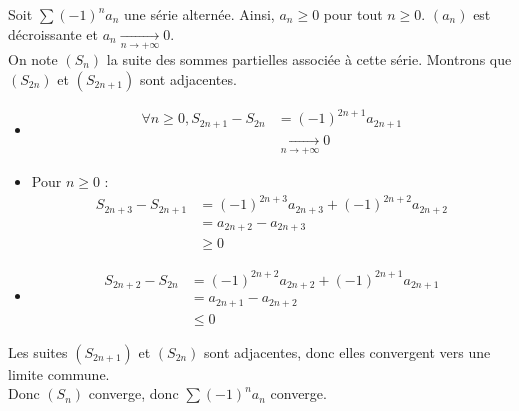 \documentclass[../main.tex]{subfiles}
\begin{document}
\noindent Soit $\sum (-1)^n a_n$ une série alternée. Ainsi, $a_n \geq 0$ pour tout $n\geq 0$. $(a_n)$ est décroissante et $a_n \underset{n \to +\infty}{\longrightarrow} 0$. \\
On note $(S_n)$ la suite des sommes partielles associée à cette série. Montrons que $(S_{2n})$ et $(S_{2n + 1})$ sont adjacentes. 
\begin{itemize}
    \item \begin{align*}
        \forall n\geq 0, S_{2n+1} - S_{2n} &= (-1)^{2n+1} a_{2n+1}  \\
        &\underset{n \to +\infty}{\longrightarrow} 0
    \end{align*}
    \item Pour $n\geq 0$ : 
    \begin{align*}
        S_{2n+3} - S_{2n+1} &= (-1)^{2n+3} a_{2n+3} + (-1)^{2n+2} a_{2n+2} \\
        &= a_{2n+2} - a_{2n+3} \\
        &\geq 0
    \end{align*}
    \item \begin{align*}
        S_{2n+2} - S_{2n} &= (-1)^{2n+2} a_{2n+2} + (-1)^{2n+1} a_{2n+1} \\
        &= a_{2n+1} - a_{2n+2} \\
        &\leq 0
    \end{align*}
\end{itemize}
Les suites $(S_{2n+1})$ et $(S_{2n})$ sont adjacentes, donc elles convergent vers une limite commune. \\
Donc $(S_n)$ converge, donc $\sum (-1)^n a_n$ converge.
\end{document}
